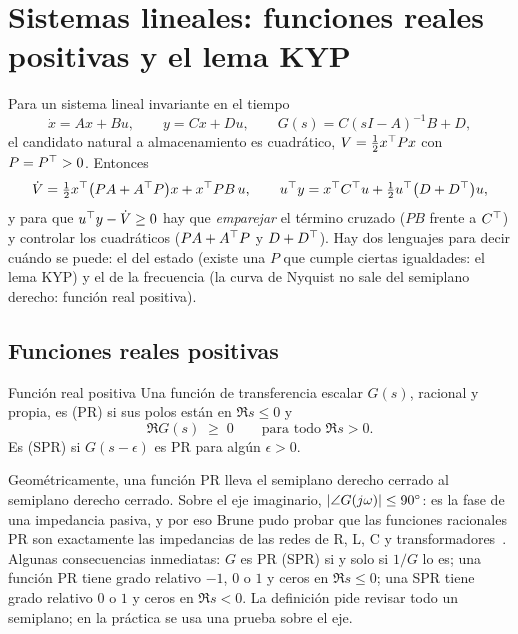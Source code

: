 \section{Sistemas lineales: funciones reales positivas y el lema KYP}
\label{sec:pa-lineales}

Para un sistema lineal invariante en el tiempo
\begin{equation}
  \dot x=Ax+Bu,\qquad y=Cx+Du,\qquad G(s)=C(sI-A)^{-1}B+D,
  \label{eq:pa-lti}
\end{equation}
el candidato natural a almacenamiento es cuadrático, $V=\tfrac12x^{\top} Px$ con $P=P^{\top}>0$. Entonces
\[
  \dot V=\tfrac12x^{\top}\bigl(PA+A^{\top} P\bigr)x+x^{\top} PB\,u,
  \qquad
  u^{\top} y=x^{\top} C^{\top} u+\tfrac12u^{\top}\bigl(D+D^{\top}\bigr)u ,
\]
y para que $u^{\top} y-\dot V\ge0$ hay que \emph{emparejar} el término cruzado ($PB$ frente a $C^{\top}$) y controlar los cuadráticos ($PA+A^{\top} P$ y $D+D^{\top}$). Hay dos lenguajes para decir cuándo se puede: el del estado (existe una $P$ que cumple ciertas igualdades: el lema KYP) y el de la frecuencia (la curva de Nyquist no sale del semiplano derecho: función real positiva). 

\subsection{Funciones reales positivas}

\begin{definicion}[label=def:pa-pr]{Función real positiva \citep[Def.~6.4]{Kha02}}
Una función de transferencia escalar $G(s)$, racional y propia, es  (PR) si sus polos están en $\Re s\le0$ y
\begin{equation}
  \Re G(s)\;\ge\;0\qquad\text{para todo }\Re s>0 .
  \label{eq:pa-pr}
\end{equation}
Es  (SPR) si $G(s-\epsilon)$ es PR para algún $\epsilon>0$.
\end{definicion}

Geométricamente, una función PR lleva el semiplano derecho cerrado al semiplano derecho cerrado. Sobre el eje imaginario, $\left\lvert \angle G(j\omega)\right\rvert\le90^{\circ}$: es la fase de una impedancia pasiva, y por eso Brune pudo probar que las funciones racionales PR son exactamente las impedancias de las redes de R, L, C y transformadores~\citep{Bru31}. Algunas consecuencias inmediatas: $G$ es PR (SPR) si y solo si $1/G$ lo es; una función PR tiene grado relativo $-1$, $0$ o $1$ y ceros en $\Re s\le0$; una SPR tiene grado relativo $0$ o $1$ y ceros en $\Re s<0$. La definición pide revisar todo un semiplano; en la práctica se usa una prueba sobre el eje.

